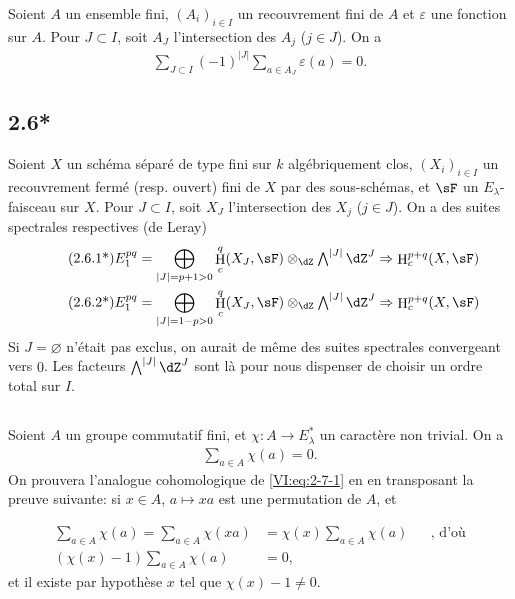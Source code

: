 \documentclass[oneside]{book}
\DeclareMathOperator{\h}{H}
\theoremstyle{sga-source}
\theoremstyle{sga-source-dash}
\theoremstyle{sga-source-dotdash}
\theoremstyle{sga-source-number-note-dash}
\theoremstyle{sga-source-note-number-dotdash}
\theoremstyle{sga-source-example-dotdash}
\theoremstyle{sga-source-inline-number}
\theoremstyle{sga-source-bare-number}
\theoremstyle{sga-source}
\newcommand{\PrintPage}[1]{}\newcommand{\MathPage}[1]{}\newcommand{\PrintCite}[2]{#1}\newcommand{\var}[3]{#1}
\begin{document}
Soient $A$ un ensemble fini, $(A_i)_{i\in I}$ un recouvrement fini de $A$ et 
$\varepsilon$ une fonction sur $A$. Pour $J\subset I$, soit $A_J$ 
l'intersection des $A_j$ ($j\in J$). On a 
\begin{align*}\tag{2.6.1}\label{VI:eq:2-6-1}
  \sum_{J\subset I} (-1)^{|J|} \sum_{a\in A_J} \varepsilon(a) = 0 \text{.}
\end{align*}





\subsection*{2.6*}\label{VI:2-6*}

Soient $X$ un schéma séparé de type fini sur $k$ algébriquement clos, 
$(X_i)_{i\in I}$ un recouvrement fermé (resp. ouvert) fini de $X$ par des 
sous-schémas, et $\sF$ un $E_\lambda$-faisceau sur $X$. Pour $J\subset I$, 
soit $X_J$ l'intersection des $X_j$ ($j\in J$). On a des suites spectrales 
respectives (de Leray) 
\begin{align*}\tag{2.6.1*}\label{VI:eq:2-6-1*}
  E_1^{p q} &= \bigoplus_{|J|=p+1>0} \h_c^q(X_J,\sF) \otimes_\dZ \textstyle\bigwedge^{|J|} \dZ^J \Rightarrow \h_c^{p+q}(X,\sF) \\ 
  \tag{2.6.2*}\label{VI:eq:2-6-2*}
  E_1^{p q} &= \bigoplus_{|J|=1-p>0} \h_c^q(X_J,\sF) \otimes_\dZ \textstyle\bigwedge^{|J|} \dZ^J \Rightarrow \h_c^{p+q}(X,\sF)
\end{align*}
Si $J=\varnothing$ \var{n'était pas exclus}{n'était pas exclu}{S45-SOL-0745}, on aurait de même des suites 
spectrales convergeant vers $0$. Les facteurs $\bigwedge^{|J|} \dZ^J$ sont là 
pour nous dispenser de choisir un ordre total sur $I$. 





\subsection{}\label{VI:2-7}

Soient $A$ un groupe commutatif fini, et $\chi:A \to E_\lambda^\ast$ un 
caractère non trivial. On a 
\begin{align*}\tag{2.7.1}\label{VI:eq:2-7-1}
  \sum_{a\in A} \chi(a) = 0 \text{.}
\end{align*}
On prouvera l'analogue cohomologique de \eqref{VI:eq:2-7-1} en en transposant 
la preuve suivante: si $x\in A$, $a\mapsto x a$ est une permutation de $A$, et 
\PrintPage{187}
\begin{align*}
  \sum_{a\in A}\chi(a) = \sum_{a\in A} \chi(x a) &= \chi(x) \sum_{a\in A} \chi(a) && \text{, d'où} \\
  (\chi(x)-1)\sum_{a\in A}\chi(a) &= 0 \text{,}
\end{align*}
et il existe par hypothèse $x$ tel que $\chi(x)-1\ne 0$. 
\end{document}
